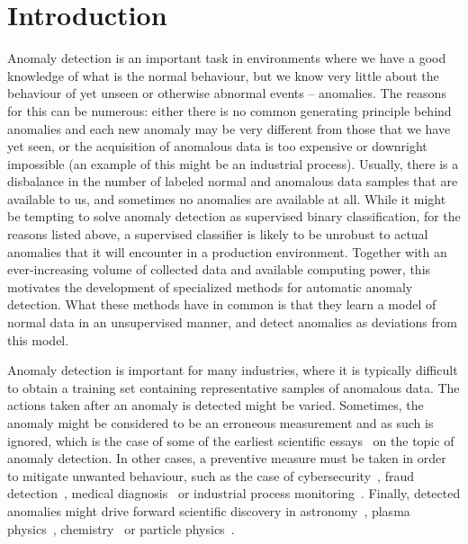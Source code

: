 \chapter{Introduction}
Anomaly detection is an important task in environments where we have a good knowledge of what is the normal behaviour, but we know very little about the behaviour of yet unseen or otherwise abnormal events -- anomalies. The reasons for this can be numerous: either there is no common generating principle behind anomalies and each new anomaly may be very different from those that we have yet seen, or the acquisition of anomalous data is too expensive or downright impossible (an example of this might be an industrial process). Usually, there is a disbalance in the number of labeled normal and anomalous data samples that are available to us, and sometimes no anomalies are available at all. While it might be tempting to solve anomaly detection as supervised binary classification, for the reasons listed above, a supervised classifier is likely to be unrobust to actual anomalies that it will encounter in a production environment. Together with an ever-increasing volume of collected data and available computing power, this motivates the development of specialized methods for automatic anomaly detection. What these methods have in common is that they learn a model of normal data in an unsupervised manner, and detect anomalies as deviations from this model. 

Anomaly detection is important for many industries, where it is typically difficult to obtain a training set containing representative samples of anomalous data. The actions taken after an anomaly is detected might be varied. Sometimes, the anomaly might be considered to be an erroneous measurement and as such is ignored, which is the case of some of the earliest scientific essays~\cite{glaisher1873rejection,edgeworth1887xli} on the topic of anomaly detection. In other cases, a preventive measure must be taken in order to mitigate unwanted behaviour, such as the case of cybersecurity~\cite{liao2013intrusion, vanerio2017ensemble,xin2018machine}, fraud detection~\cite{bolton2002statistical, perols2011financial, ahmed2016survey}, medical diagnosis~\cite{tarassenko1995novelty, wong2003bayesian, iakovidis2018detecting,zhou2019anomalynet} or industrial process monitoring~\cite{mahmoudi2019layerwise, bai2020anomaly, choi2020gan}. Finally, detected anomalies might drive forward scientific discovery in astronomy~\cite{protopapas2006finding}, plasma physics~\cite{vskvara2020detection}, chemistry~\cite{oprea2002chemical} or particle physics~\cite{fraser2022challenges}.

